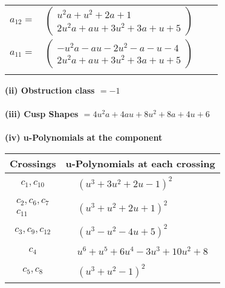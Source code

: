 \documentclass[1p]{elsarticle_modified}
\theoremstyle{definition}
\begin{document}
\begin{tabular}{m{7pt} m{180pt} m{7pt} m{180pt} }
\flushright $a_{12}=$&$\begin{pmatrix}u^2 a+u^2+2 a+1\\2 u^2 a+a u+3 u^2+3 a+u+5\end{pmatrix}$ \\
\flushright $a_{11}=$&$\begin{pmatrix}- u^2 a- a u-2 u^2- a- u-4\\2 u^2 a+a u+3 u^2+3 a+u+5\end{pmatrix}$\\&\end{tabular}
\flushleft \textbf{(ii) Obstruction class $= -1$}\\~\\
\flushleft \textbf{(iii) Cusp Shapes $= 4 u^2 a+4 a u+8 u^2+8 a+4 u+6$}\\~\\
\newpage\renewcommand{\arraystretch}{1}
\flushleft \textbf{(iv) u-Polynomials at the component}\newline \\
\begin{tabular}{m{50pt}|m{274pt}}
Crossings & \hspace{64pt}u-Polynomials at each crossing \\
\hline $$\begin{aligned}c_{1},c_{10}\end{aligned}$$&$\begin{aligned}
&(u^3+3 u^2+2 u-1)^2
\end{aligned}$\\
\hline $$\begin{aligned}c_{2},c_{6},c_{7}\\c_{11}\end{aligned}$$&$\begin{aligned}
&(u^3+u^2+2 u+1)^2
\end{aligned}$\\
\hline $$\begin{aligned}c_{3},c_{9},c_{12}\end{aligned}$$&$\begin{aligned}
&(u^3- u^2-4 u+5)^2
\end{aligned}$\\
\hline $$\begin{aligned}c_{4}\end{aligned}$$&$\begin{aligned}
&u^6+u^5+6 u^4-3 u^3+10 u^2+8
\end{aligned}$\\
\hline $$\begin{aligned}c_{5},c_{8}\end{aligned}$$&$\begin{aligned}
&(u^3+u^2-1)^2
\end{aligned}$\\
\hline
\end{tabular}\\~\\
\end{document}
